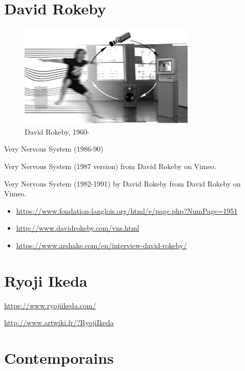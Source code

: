 \documentclass[
  french,
]{book}
\providecommand{\tightlist}{%
  \setlength{\itemsep}{0pt}\setlength{\parskip}{0pt}}
\begin{document}
\hypertarget{david-rokeby}{%
\section{David Rokeby}\label{david-rokeby}}

\begin{figure}
\centering
\includegraphics[width=0.75\textwidth,height=\textheight]{medias/corpus/rokeby/d00004229-wide.jpg}
\caption{David Rokeby, 1960-}
\end{figure}

Very Nervous System (1986-90)

Very Nervous System (1987 version) from David Rokeby on Vimeo.

Very Nervous System (1982-1991) by David Rokeby from David Rokeby on Vimeo.

\begin{itemize}
\tightlist
\item
  \url{https://www.fondation-langlois.org/html/e/page.php?NumPage=1951}
\item
  \url{http://www.davidrokeby.com/vns.html}
\item
  \url{https://www.arshake.com/en/interview-david-rokeby/}
\end{itemize}

\hypertarget{ryoji-ikeda}{%
\section{Ryoji Ikeda}\label{ryoji-ikeda}}

\url{https://www.ryojiikeda.com/}

\url{http://www.artwiki.fr/?RyojiIkeda}

\hypertarget{contemporains}{%
\section{Contemporains}\label{contemporains}}
\end{document}
